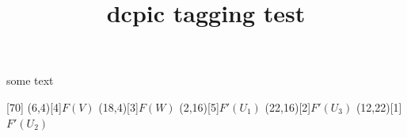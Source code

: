 \documentclass{article}
\title{dcpic tagging test}
\begin{document}
some text

\begindc{\commdiag}[70]
\obj(6,4)[4]{$F(V)$}
\obj(18,4)[3]{$F(W)$} 
\obj(2,16)[5]{$F'(U_1)$} 
\obj(22,16)[2]{$F'(U_3)$}
\obj(12,22)[1]{$F'(U_2)$}
\enddc
\end{document}
